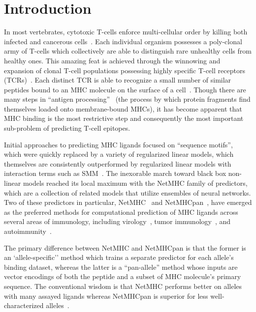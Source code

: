 \section{Introduction}
In most vertebrates, cytotoxic T-cells enforce multi-cellular order by killing both infected and cancerous cells~\cite{Anderson_2004}. Each individual organism possesses a poly-clonal army of T-cells which collectively are able to distinguish rare unhealthy cells from healthy ones. This amazing feat is achieved through the winnowing and expansion of clonal T-cell populations possessing highly specific T-cell receptors (TCRs)~\cite{Blackman_1990}. Each distinct TCR is able to recognize a small number of similar peptides bound to an MHC molecule on the surface of a cell~\cite{Huseby_2005}. Though there are many steps in ``antigen processing''~\cite{Cresswell_2005} (the process by which protein fragments find themselves loaded onto membrane-bound MHCs), it has become apparent that MHC binding is the most restrictive step and consequently the most important sub-problem of predicting T-cell epitopes. 

Initial approaches to predicting MHC ligands focused on ``sequence motifs''\cite{Sette_1989}, which were quickly replaced by a variety of regularized linear models, which themselves are consistently outperformed by regularized linear models with interaction terms such as SMM~\cite{Peters_2003}. The inexorable march toward black box non-linear models reached its local maximum with the NetMHC family of predictors, which are a collection of related models that utilize ensembles of neural networks. Two of these predictors in particular, NetMHC~\cite{Lundegaard_2008} and NetMHCpan~\cite{Nielsen_2007}, have emerged as the preferred methods for computational prediction of MHC ligands across several areas of immunology, including virology~\cite{Lund_2011}, tumor immunology~\cite{Gubin_2015}, and autoimmunity~\cite{Abreu_2012}. 

The primary difference between NetMHC and NetMHCpan is that the former is an `allele-specific'' method which trains a separate predictor for each allele's binding dataset, whereas the latter is a ``pan-allele'' method whose inputs are vector encodings of both the peptide and a subset of MHC molecule's primary sequence. The conventional wisdom is that NetMHC performs better on alleles with many assayed ligands whereas NetMHCpan is superior for less well-characterized alleles~\cite{Gfeller_2016}.


